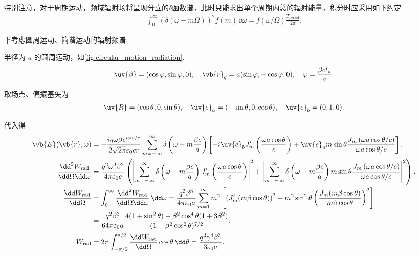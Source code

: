特别注意，对于周期运动，频域辐射场将呈现分立的\(\delta\)函数谱，此时只能求出单个周期内总的辐射能量，积分时应采用如下约定
\begin{align*}
	\int_{0}^{\infty} \left( \delta(\omega - m \Omega) \right)^{2} f(m) \, \dd \omega = f(\omega/\Omega) \frac{T_{\mathrm{period}}}{2\pi}.
\end{align*}

下考虑圆周运动、简谐运动的辐射频谱.

\begin{exbox}
	半径为 \(a\) 的圆周运动，如\cref{fig:circular_motion_radiation}.
	\begin{align*}
		\uv{\beta} = (\cos\varphi, \sin\varphi, 0), \quad \vb{r}_{q} = a (\sin\varphi, -\cos\varphi, 0), \quad \varphi = \frac{\beta c t_{s}}{a}.
	\end{align*}

	取场点、偏振基矢为
	\begin{align*}
		\uv{R} = (\cos\theta, 0, \sin\theta), \quad \uv{e}_{a} = (-\sin\theta, 0, \cos\theta), \quad \uv{e}_{b} = (0, 1, 0).
	\end{align*}

	代入得
	\begin{align*}
		\vb{E}(\vb{r}, \omega) &= -\frac{i q \omega \beta e^{i\omega r/c}}{2\sqrt{2\pi} \varepsilon_{0} c r} \sum_{m=-\infty}^{\infty} \delta\left( \omega - m \frac{\beta c}{a} \right) \left[ -i \uv{e}_{b} J_{m}'\left( \frac{\omega a \cos\theta}{c} \right) + \uv{e}_{a} m \sin\theta \frac{J_{m}\left( \omega a \cos\theta/c \right)}{\omega a \cos\theta/c} \right]. \\
		\frac{\dd^{2} W_{\mathrm{rad}}}{\dd \Omega \dd \omega} &= \frac{q^{2} \omega^{2} \beta^{2}}{4\pi \varepsilon_{0} c} \left( \left| \sum_{m=-\infty}^{\infty} \delta\left( \omega - m \frac{\beta c}{a} \right) J_{m}'\left( \frac{\omega a \cos\theta}{c} \right) \right|^{2} + \left| \sum_{m=-\infty}^{\infty} \delta\left( \omega - m \frac{\beta c}{a} \right) m \sin\theta \frac{J_{m}\left(\omega a \cos\theta/c \right)}{\omega a \cos\theta/c} \right|^{2} \right). \\
		\frac{\dd  W_{\mathrm{rad}}}{\dd \Omega} &= \int_{0}^{\infty} \frac{\dd^{2} W_{\mathrm{rad}}}{\dd \Omega \dd \omega} \, \dd \omega = \frac{q^{2} \beta^{3}}{4\pi \varepsilon_{0} a} \sum_{m=1}^{\infty} m^{2} \left[ \left( J_{m}'(m\beta \cos\theta) \right)^{2} + m^{2} \sin^{2}\theta \left( \frac{J_{m}(m\beta \cos\theta)}{m\beta \cos\theta} \right)^{2} \right] \\
		&= \frac{q^{2} \beta^{3}}{64\pi \varepsilon_{0} a} \frac{4(1 + \sin^{2}\theta) - \beta^{2} \cos^{4}\theta (1 + 3\beta^{2})}{(1 - \beta^{2} \cos^{2}\theta)^{7/2}}. \\
		W_{\mathrm{rad}} &= 2\pi \int_{-\pi/2}^{\pi/2} \frac{\dd  W_{\mathrm{rad}}}{\dd \Omega} \cos\theta \, \dd \theta = \frac{q^{2} \gamma^{4} \beta^{3}}{3 \varepsilon_{0} a}.
	\end{align*}


\end{exbox}
